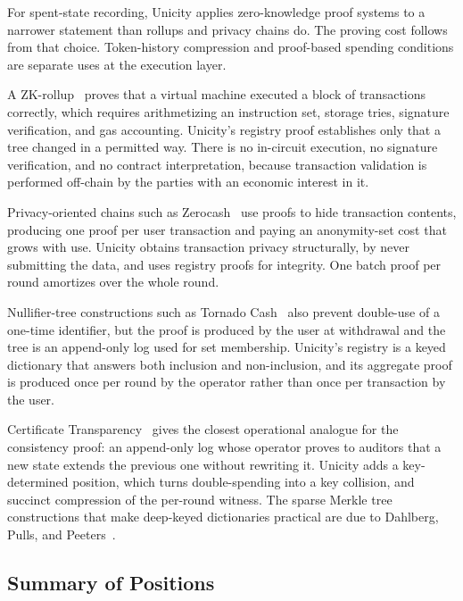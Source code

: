 For spent-state recording, Unicity applies zero-knowledge proof systems to a narrower statement than rollups and privacy chains do. The proving cost follows from that choice. Token-history compression and proof-based spending conditions are separate uses at the execution layer.

A ZK-rollup~\cite{polygonzkevm} proves that a virtual machine executed a block of transactions correctly, which requires arithmetizing an instruction set, storage tries, signature verification, and gas accounting. Unicity's registry proof establishes only that a tree changed in a permitted way. There is no in-circuit execution, no signature verification, and no contract interpretation, because transaction validation is performed off-chain by the parties with an economic interest in it.

Privacy-oriented chains such as Zerocash~\cite{zerocash} use proofs to hide transaction contents, producing one proof per user transaction and paying an anonymity-set cost that grows with use. Unicity obtains transaction privacy structurally, by never submitting the data, and uses registry proofs for integrity. One batch proof per round amortizes over the whole round.

Nullifier-tree constructions such as Tornado Cash~\cite{tornado} also prevent double-use of a one-time identifier, but the proof is produced by the user at withdrawal and the tree is an append-only log used for set membership. Unicity's registry is a keyed dictionary that answers both inclusion and non-inclusion, and its aggregate proof is produced once per round by the operator rather than once per transaction by the user.

Certificate Transparency~\cite{rfc6962} gives the closest operational analogue for the consistency proof: an append-only log whose operator proves to auditors that a new state extends the previous one without rewriting it. Unicity adds a key-determined position, which turns double-spending into a key collision, and succinct compression of the per-round witness. The sparse Merkle tree constructions that make deep-keyed dictionaries practical are due to Dahlberg, Pulls, and Peeters~\cite{dahlberg2016}.

\subsection{Summary of Positions}

